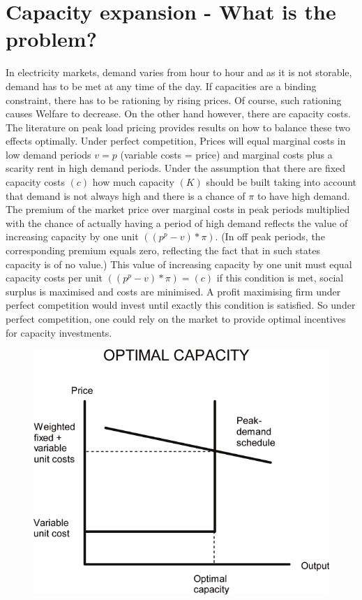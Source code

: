 \section{Capacity expansion - What is the problem?}

In electricity markets, demand varies from hour to hour and as it is not storable, demand has to be met at any time of the day. If capacities are a binding constraint, there has to be rationing by rising prices. Of course, such rationing causes Welfare to decrease. On the other hand however, there are capacity costs. The literature on peak load pricing provides results on how to balance these two effects optimally. Under perfect competition, Prices will equal marginal costs in low demand periods $v=p$ (variable costs = price) and marginal costs plus a scarity rent in high demand periods. Under the assumption that there are fixed capacity costs $(c)$ how much capacity $(K)$ should be built taking into account that demand is not always high and there is a chance of $\pi$ to have high demand. The premium of the market price over marginal costs in peak periods multiplied with the chance of actually having a period of high demand reflects the value of increasing capacity by one unit $((p^p-v)*\pi)$. (In off peak periods, the corresponding premium equals zero, reflecting the fact that in such states capacity is of no value.) This value of increasing capacity by one unit must equal capacity costs per unit $((p^p-v)*\pi)=(c)$ if this condition is met, social surplus is maximised and costs are minimised. A profit maximising firm under perfect competition would invest until exactly this condition is satisfied. So under perfect competition, one could rely on the market to provide optimal incentives for capacity investments.

\begin{figure}[h]
\centering
\includegraphics[width=.7\textwidth]{capacity/peak_load_opt}
      \label{von der Fehr and Harbord 1997}            
\end{figure}

